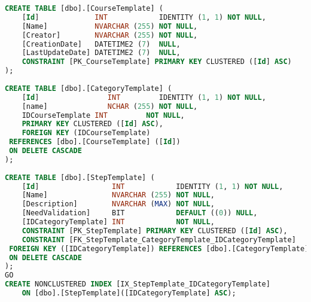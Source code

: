 \begin{lstlisting}[language=SQL, caption=traduzione della progettazione del database nel linguaggio SQL]
CREATE TABLE [dbo].[CourseTemplate] ( 
    [Id]             INT            IDENTITY (1, 1) NOT NULL, 
    [Name]           NVARCHAR (255) NOT NULL, 
    [Creator]        NVARCHAR (255) NOT NULL, 
    [CreationDate]   DATETIME2 (7)  NULL, 
    [LastUpdateDate] DATETIME2 (7)  NULL, 
    CONSTRAINT [PK_CourseTemplate] PRIMARY KEY CLUSTERED ([Id] ASC) 
); 
 
CREATE TABLE [dbo].[CategoryTemplate] ( 
    [Id]                INT         IDENTITY (1, 1) NOT NULL, 
    [name]              NCHAR (255) NOT NULL, 
    IDCourseTemplate INT         NOT NULL, 
    PRIMARY KEY CLUSTERED ([Id] ASC), 
    FOREIGN KEY (IDCourseTemplate)  
 REFERENCES [dbo].[CourseTemplate] ([Id]) 
 ON DELETE CASCADE 
); 
 
CREATE TABLE [dbo].[StepTemplate] ( 
    [Id]                 INT            IDENTITY (1, 1) NOT NULL, 
    [Name]               NVARCHAR (255) NOT NULL, 
    [Description]        NVARCHAR (MAX) NOT NULL, 
    [NeedValidation]     BIT            DEFAULT ((0)) NULL, 
    [IDCategoryTemplate] INT            NOT NULL, 
    CONSTRAINT [PK_StepTemplate] PRIMARY KEY CLUSTERED ([Id] ASC), 
    CONSTRAINT [FK_StepTemplate_CategoryTemplate_IDCategoryTemplate]  
 FOREIGN KEY ([IDCategoryTemplate]) REFERENCES [dbo].[CategoryTemplate] ([Id]) 
 ON DELETE CASCADE 
); 
GO 
CREATE NONCLUSTERED INDEX [IX_StepTemplate_IDCategoryTemplate] 
    ON [dbo].[StepTemplate]([IDCategoryTemplate] ASC);
\end{lstlisting}